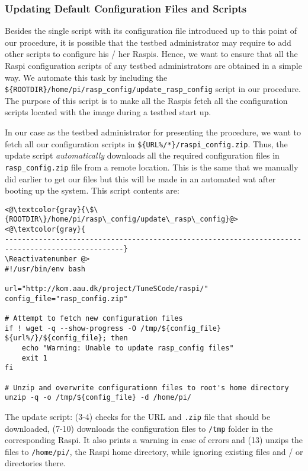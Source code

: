 \subsubsection{Updating Default Configuration Files and Scripts}
Besides the single script with its configuration file introduced up
to this point of our procedure, it is possible that the testbed
administrator may require to add other scripts to configure
his / her \ac{Raspi}s. Hence, we want
to ensure that all the \ac{Raspi} configuration scripts of any testbed
administrators are obtained in a simple way. We automate this task by
including the \texttt{\$\{ROOTDIR\}/home/pi/rasp\_config/update\_rasp\_config}
script in our procedure. The purpose of this script is to make all the
\ac{Raspi}s fetch all the configuration scripts located with the image
during a testbed start up.

In our case as the testbed administrator for presenting the procedure, we want
to fetch all our configuration scripts in
\texttt{\$\{URL\%/*\}/raspi\_config.zip}. Thus, the update script
\textit{automatically} downloads all the required configuration files in
\texttt{rasp\_config.zip} file from a remote location. This is the same that
we manually did earlier to get our files but this will be made in an
automated wat after booting up the system. This script contents are:

\Suppressnumber\begin{lstlisting}[]
<@\textcolor{gray}{\$\{ROOTDIR\}/home/pi/rasp\_config/update\_rasp\_config}@>
<@\textcolor{gray}{
--------------------------------------------------------------------------------------------------}
\Reactivatenumber @>
#!/usr/bin/env bash

url="http://kom.aau.dk/project/TuneSCode/raspi/"
config_file="rasp_config.zip"

# Attempt to fetch new configuration files
if ! wget -q --show-progress -O /tmp/${config_file} ${url%/}/${config_file}; then
    echo "Warning: Unable to update rasp_config files"
    exit 1
fi

# Unzip and overwrite configurationn files to root's home directory
unzip -q -o /tmp/${config_file} -d /home/pi/
\end{lstlisting}
\FloatBarrier
\vspace{-5mm}

The update script: (3-4) checks for the \ac{URL} and \texttt{.zip} file that
should be downloaded, (7-10) downloads the configuration files to \texttt{/tmp}
folder in the corresponding \ac{Raspi}. It also prints a warning in case of
errors and (13) unzips the files to \texttt{/home/pi/}, the \ac{Raspi} home
directory, while ignoring existing files and / or directories there.


